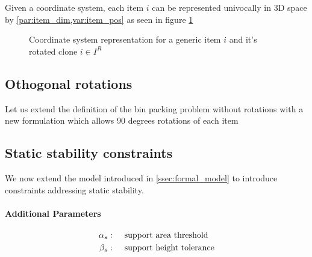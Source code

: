 Given a coordinate system, each item $i$ can be represented univocally in 3D space by \cref{par:item_dim,var:item_pos} as seen in figure \ref{fig:coordinate_system}
\begin{figure}
    \scalebox{0.65}{%
    
    }
    \caption{Coordinate system representation for a generic item $i$ and it's rotated clone $i \in I^R$ 
    \label{fig:coordinate_system}}
\end{figure}

\subsection*{Othogonal rotations}

Let us extend the definition of the bin packing problem without rotations with a new formulation which allows $90$ degrees rotations of each item 

\subsection*{Static stability constraints}

We now extend the model introduced in \cref{ssec:formal_model} to introduce constraints addressing static stability.

\paragraph*{Additional Parameters}
\begin{align*}
    \alpha_s  :\hspace{.5cm}& \text{support area threshold} \\
    \beta_s  :\hspace{.5cm}& \text{support height tolerance} 
\end{align*}
